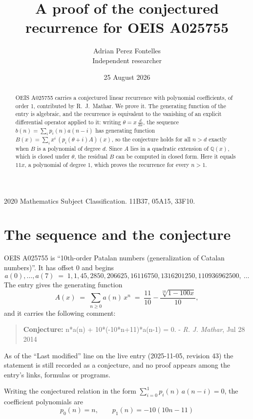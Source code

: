 \documentclass[11pt,a4paper]{article}
\title{A proof of the conjectured recurrence for OEIS A025755}
\author{Adrian Perez Fontelles\\ \small Independent researcher}
\date{25 August 2026}
\theoremstyle{plain}
\theoremstyle{definition}
\begin{document}
\maketitle

\begin{abstract}
OEIS A025755 carries a conjectured linear recurrence with polynomial coefficients, of
order 1, contributed by R.~J.~Mathar. We prove it. The generating function of the
entry is algebraic, and the recurrence is equivalent to the vanishing of an explicit
differential operator applied to it: writing $\theta=x\,\frac{d}{dx}$, the sequence
$b(n)=\sum_{i}p_{i}(n)a(n-i)$ has generating function
$B(x)=\sum_{i}x^{i}\,(p_{i}(\theta+i)A)(x)$, so the conjecture holds for all $n>d$ exactly
when $B$ is a polynomial of degree $d$. Since $A$ lies in a quadratic extension of
$\mathbb{Q}(x)$, which is closed under $\theta$, the residual $B$ can be computed in
closed form. Here it equals $11 x$, a polynomial of degree $1$, which proves
the recurrence for every $n>1$.
\end{abstract}

\noindent\small 2020 Mathematics Subject Classification. 11B37, 05A15, 33F10.\normalsize

\section{The sequence and the conjecture}

OEIS A025755 is ``10th-order Patalan numbers (generalization of Catalan numbers)''. It has offset $0$ and begins
\[
a(0),\dots,a(7)\;=\;1, 1, 45, 2850, 206625, 16116750, 1316201250, 110936962500,\ \dots
\]
The entry gives the generating function
\begin{equation}\label{eq:gf}
A(x)\;=\;\sum_{n\ge 0} a(n)\,x^{n}\;=\;\frac{11}{10} - \frac{\sqrt[10]{1 - 100 x}}{10} ,
\end{equation}
and it carries the following comment:
\begin{quote}\small
\textbf{Conjecture:} n*a(n) + 10*(-10*n+11)*a(n-1) = 0. - \emph{R. J. Mathar}, Jul 28 2014
\end{quote}
As of the ``Last modified'' line on the live entry (2025-11-05, revision 43) the
statement is still recorded as a conjecture, and no proof appears among the entry's links,
formulas or programs.

Writing the conjectured relation in the form $\sum_{i=0}^{1}p_{i}(n)\,a(n-i)=0$,
the coefficient polynomials are
\[
p_{0}(n)=n,\qquad p_{1}(n)=- 10 \left(10 n - 11\right)
\]
\end{document}
